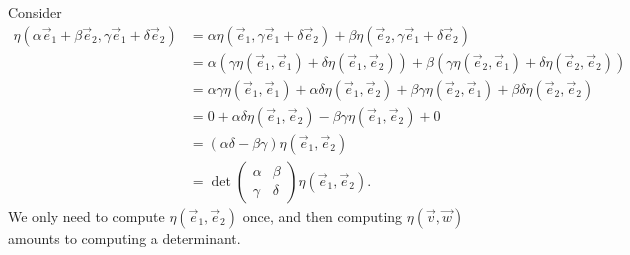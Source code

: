 Consider
\begin{subequations}
\begin{align}
\eta(\alpha\vec{e}_{1}+\beta\vec{e}_{2},
\gamma\vec{e}_{1}+\delta\vec{e}_{2})
&=\alpha\eta(\vec{e}_{1}, \gamma\vec{e}_{1}+\delta\vec{e}_{2})
+\beta\eta(\vec{e}_{2}, \gamma\vec{e}_{1}+\delta\vec{e}_{2})\\
&=\alpha(\gamma\eta(\vec{e}_{1}, \vec{e}_{1}) +\delta\eta(\vec{e}_{1}, \vec{e}_{2}))
+\beta(\gamma\eta(\vec{e}_{2}, \vec{e}_{1}) +\delta\eta(\vec{e}_{2}, \vec{e}_{2}))\\
&=\alpha\gamma\eta(\vec{e}_{1}, \vec{e}_{1})
+\alpha\delta\eta(\vec{e}_{1}, \vec{e}_{2})
+\beta\gamma\eta(\vec{e}_{2}, \vec{e}_{1})
+\beta\delta\eta(\vec{e}_{2}, \vec{e}_{2})\\
&=0 +\alpha\delta\eta(\vec{e}_{1}, \vec{e}_{2})
-\beta\gamma\eta(\vec{e}_{1}, \vec{e}_{2})
+ 0\\
&= (\alpha\delta-\beta\gamma)\eta(\vec{e}_{1}, \vec{e}_{2})\\
&=\det\begin{pmatrix}\alpha & \beta\\
\gamma & \delta
\end{pmatrix}\eta(\vec{e}_{1}, \vec{e}_{2}).
\end{align}
\end{subequations}
We only need to compute $\eta(\vec{e}_{1}, \vec{e}_{2})$ once, and then
computing $\eta(\vec{v},\vec{w})$ amounts to computing a determinant.



